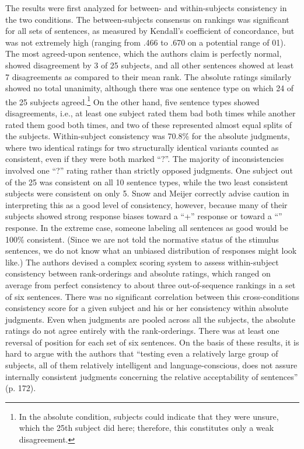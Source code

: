 The results were first analyzed for between- and within-subjects consistency in the two conditions. The between-subjects consensus on rankings was significant for all sets of sentences, as measured by Kendall's coefficient of concordance, but was not extremely high (ranging from .466 to .670 on a potential range of 0\textendash{}1). The most agreed-upon sentence, which the authors claim is perfectly normal, showed disagreement by 3 of 25 subjects, and all other sentences showed at least 7 disagreements as compared to their mean rank. The absolute ratings similarly showed no total unanimity, although there was one sentence type on which 24 of the 25 subjects agreed.\footnote{ In the absolute condition, subjects could indicate that they were unsure, which the 25th subject did here; therefore, this constitutes only a weak disagreement.}
 On the other hand, five sentence types showed disagreements, i.e., at least one subject rated them bad both times while another rated them good both times, and two of these represented almost equal splits of the subjects. Within-subject consistency was 70.8\% for the absolute judgments, where two identical ratings for two structurally identical variants counted as consistent, even if they were both marked ``?''. The majority of inconsistencies involved one ``?'' rating rather than strictly opposed judgments. One subject out of the 25 was consistent on all 10 sentence types, while the two least consistent subjects were consistent on only 5. Snow and Meijer correctly advise caution in interpreting this as a good level of consistency, however, because many of their
subjects showed strong response biases toward a ``+'' response or toward a ``\textminus''
response. In the extreme case, someone labeling all sentences as good would be 100\% consistent. (Since we are not told the normative status of the stimulus sentences, we do not know what an unbiased distribution of responses might look like.) The authors devised a complex scoring system to assess within-subject consistency between rank-orderings and absolute ratings, which ranged on average from perfect consistency to about three out-of-sequence rankings in a set of six sentences. There was no significant correlation between this cross-conditions consistency score for a given subject and his or her consistency within absolute judgments. Even when judgments are pooled across all the subjects, the absolute ratings do not agree entirely with the rank-orderings. There was at least one reversal
of position for each set of six sentences. On the basis of these results, it is hard to
argue with the authors that ``testing even a relatively large group of subjects, all of
them relatively intelligent and language-conscious, does not assure internally consistent judgments concerning the relative acceptability of sentences'' (p. 172). 

